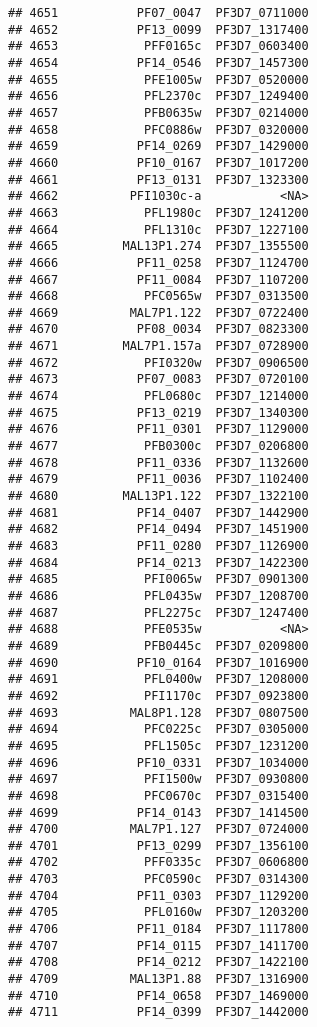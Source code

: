 \documentclass{article}\usepackage[]{graphicx}\usepackage[]{color}
\makeatletter
\newenvironment{kframe}{%
 \def\at@end@of@kframe{}%
 \ifinner\ifhmode%
  \def\at@end@of@kframe{\end{minipage}}%
  \begin{minipage}{\columnwidth}%
 \fi\fi%
 \def\FrameCommand##1{\hskip\@totalleftmargin \hskip-\fboxsep
 \colorbox{shadecolor}{##1}\hskip-\fboxsep
     \hskip-\linewidth \hskip-\@totalleftmargin \hskip\columnwidth}%
 \MakeFramed {\advance\hsize-\width
   \@totalleftmargin\z@ \linewidth\hsize
   \@setminipage}}%
 {\par\unskip\endMakeFramed%
 \at@end@of@kframe}
\newenvironment{knitrout}{}{} %
\makeatother
\begin{document}
\begin{knitrout}
\begin{kframe}
\begin{verbatim}
## 4651           PF07_0047  PF3D7_0711000
## 4652           PF13_0099  PF3D7_1317400
## 4653            PFF0165c  PF3D7_0603400
## 4654           PF14_0546  PF3D7_1457300
## 4655            PFE1005w  PF3D7_0520000
## 4656            PFL2370c  PF3D7_1249400
## 4657            PFB0635w  PF3D7_0214000
## 4658            PFC0886w  PF3D7_0320000
## 4659           PF14_0269  PF3D7_1429000
## 4660           PF10_0167  PF3D7_1017200
## 4661           PF13_0131  PF3D7_1323300
## 4662          PFI1030c-a           <NA>
## 4663            PFL1980c  PF3D7_1241200
## 4664            PFL1310c  PF3D7_1227100
## 4665         MAL13P1.274  PF3D7_1355500
## 4666           PF11_0258  PF3D7_1124700
## 4667           PF11_0084  PF3D7_1107200
## 4668            PFC0565w  PF3D7_0313500
## 4669          MAL7P1.122  PF3D7_0722400
## 4670           PF08_0034  PF3D7_0823300
## 4671         MAL7P1.157a  PF3D7_0728900
## 4672            PFI0320w  PF3D7_0906500
## 4673           PF07_0083  PF3D7_0720100
## 4674            PFL0680c  PF3D7_1214000
## 4675           PF13_0219  PF3D7_1340300
## 4676           PF11_0301  PF3D7_1129000
## 4677            PFB0300c  PF3D7_0206800
## 4678           PF11_0336  PF3D7_1132600
## 4679           PF11_0036  PF3D7_1102400
## 4680         MAL13P1.122  PF3D7_1322100
## 4681           PF14_0407  PF3D7_1442900
## 4682           PF14_0494  PF3D7_1451900
## 4683           PF11_0280  PF3D7_1126900
## 4684           PF14_0213  PF3D7_1422300
## 4685            PFI0065w  PF3D7_0901300
## 4686            PFL0435w  PF3D7_1208700
## 4687            PFL2275c  PF3D7_1247400
## 4688            PFE0535w           <NA>
## 4689            PFB0445c  PF3D7_0209800
## 4690           PF10_0164  PF3D7_1016900
## 4691            PFL0400w  PF3D7_1208000
## 4692            PFI1170c  PF3D7_0923800
## 4693          MAL8P1.128  PF3D7_0807500
## 4694            PFC0225c  PF3D7_0305000
## 4695            PFL1505c  PF3D7_1231200
## 4696           PF10_0331  PF3D7_1034000
## 4697            PFI1500w  PF3D7_0930800
## 4698            PFC0670c  PF3D7_0315400
## 4699           PF14_0143  PF3D7_1414500
## 4700          MAL7P1.127  PF3D7_0724000
## 4701           PF13_0299  PF3D7_1356100
## 4702            PFF0335c  PF3D7_0606800
## 4703            PFC0590c  PF3D7_0314300
## 4704           PF11_0303  PF3D7_1129200
## 4705            PFL0160w  PF3D7_1203200
## 4706           PF11_0184  PF3D7_1117800
## 4707           PF14_0115  PF3D7_1411700
## 4708           PF14_0212  PF3D7_1422100
## 4709          MAL13P1.88  PF3D7_1316900
## 4710           PF14_0658  PF3D7_1469000
## 4711           PF14_0399  PF3D7_1442000

\end{verbatim}
\end{kframe}
\end{knitrout}
\end{document}
